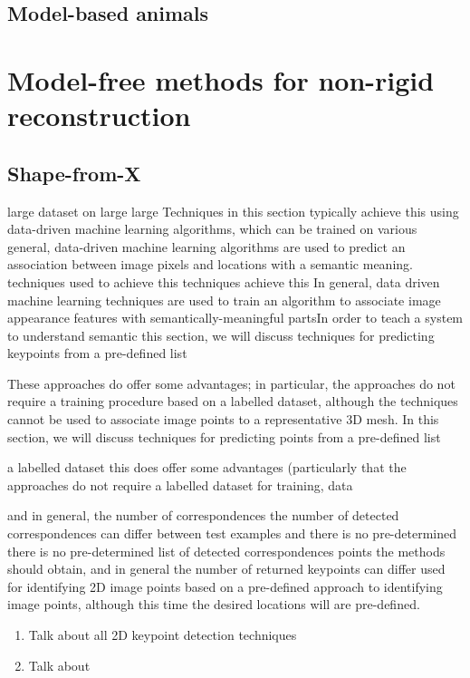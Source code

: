 \subsection{Model-based animals}

\section{Model-free methods for non-rigid reconstruction}

\subsection{Shape-from-X}





large dataset on large large Techniques in this section typically achieve this using data-driven machine learning algorithms, which can be trained on various  general, data-driven machine learning algorithms are used to predict an association between image pixels and locations with a semantic meaning. techniques used to achieve this techniques achieve this In general, data driven machine learning techniques are used to train an algorithm to associate image appearance features with semantically-meaningful partsIn order to teach a system to understand semantic this section, we will discuss techniques for predicting keypoints from a pre-defined list

These approaches do offer some advantages; in particular, the approaches do not require a training procedure based on a labelled dataset, although the techniques cannot be used to associate image points to a representative 3D mesh. In this section, we will discuss techniques for predicting points from a pre-defined list 

a labelled dataset this does offer some advantages (particularly that the approaches do not require a labelled dataset for training, data 

and in general, the number of correspondences the number of detected correspondences can differ between test examples and there is no pre-determined there is no pre-determined list of detected correspondences points the methods should obtain, and in general the number of returned keypoints can differ  used for identifying 2D image points based on a pre-defined   approach to identifying image points, although this time the desired locations will are pre-defined.

\begin{enumerate}
    \item Talk about all 2D keypoint detection techniques
    \item Talk about 
\end{enumerate}



